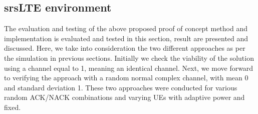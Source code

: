 \documentclass{article}
\begin{document}




\subsection{srsLTE environment}
The evaluation and testing of the above proposed proof of concept method and implementation is evaluated and tested in this section, result are presented and discussed. Here, we take into consideration the two different approaches as per the simulation in previous sections. Initially we check the viability of the solution using a channel equal to 1, meaning an identical channel. Next, we move forward to verifying the approach with a random normal complex channel, with mean 0 and standard deviation 1. These two approaches were conducted for various random ACK/NACK combinations and varying UEs with adaptive power and fixed. 
\end{document}
